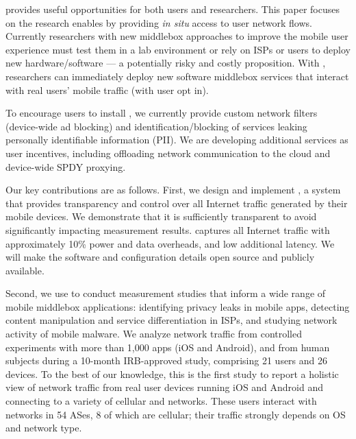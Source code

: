 

\meddle provides useful opportunities for both users and researchers.
This paper 
focuses on the research \meddle enables by providing \emph{in situ} access to 
user network flows. Currently researchers with new  
middlebox approaches to improve the mobile user experience must test them in a lab environment or 
rely on ISPs or users to deploy new hardware/software --- a potentially risky and costly 
proposition. With \meddle, researchers 
can immediately deploy new software middlebox services that interact with 
real users' mobile traffic (with user opt in). %

To encourage users to install \meddle, we currently provide custom 
network filters (\eg device-wide ad blocking) and identification/blocking of services leaking 
personally identifiable information (PII). We are developing additional services as user incentives, 
including offloading network communication to the cloud and device-wide SPDY proxying.

Our key contributions are as follows. First, we design and implement \meddle, a system that provides transparency 
and control 
over all Internet traffic generated by their 
mobile devices. We demonstrate that it is sufficiently transparent to avoid significantly impacting measurement results. 
\platname captures all Internet traffic with approximately 10\% power and data overheads, and low additional latency. 
We will make the \platname software and configuration details open source and publicly available.

Second, we use \meddle to conduct measurement studies that inform 
a wide range of mobile middlebox applications: identifying privacy leaks in mobile apps, detecting content 
manipulation and service differentiation in ISPs, and studying network activity of mobile malware. We analyze network traffic from controlled experiments with more than 1,000 apps (iOS and Android), 
and from human subjects during a 10-month IRB-approved study, comprising 21 users and 26 devices. To the best of our knowledge, this is the first study to report a holistic view of network traffic from real user devices running iOS and Android and 
connecting to a variety of cellular and \wifi networks. These users interact with networks in 54 ASes,
8 of which are cellular; their traffic strongly depends on OS and network type.


